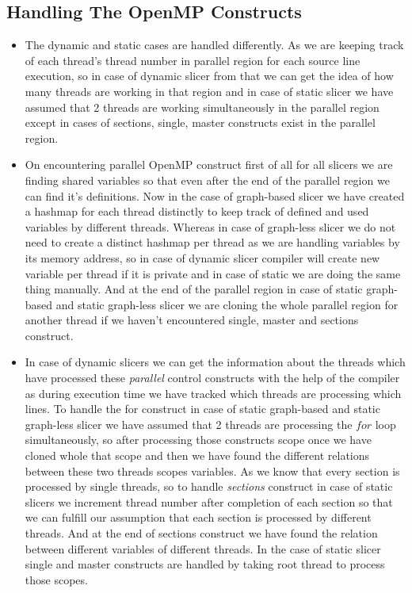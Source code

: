\documentclass[conference]{IEEEtran}
\begin{document}
\subsection{Handling The OpenMP Constructs}
\begin{itemize}
\item The dynamic and static cases are handled  differently. As we are keeping track of each thread’s thread number in parallel region for each source line execution, so in case of dynamic slicer from that we can get the idea of how many threads are working in that region and in case of static slicer we have assumed that 2 threads are working simultaneously in the parallel region except in cases of sections, single, master constructs exist in the parallel region.
\item On encountering parallel OpenMP construct first of all for all slicers we are finding shared variables so that even after the end of the parallel region we can find it’s definitions. Now in the case of graph-based slicer we have created a hashmap for each thread distinctly to keep track of defined and used variables by different threads. Whereas in case of graph-less slicer we do not need to create a distinct hashmap per thread as we are handling variables by its memory address, so in case of dynamic slicer compiler will create new variable per thread if it is private and in case of static we are doing the same thing manually. And at the end of the parallel region in case of static graph-based and static graph-less slicer we are cloning the whole parallel region for another thread if we haven’t encountered single, master and sections construct.
\item In case of dynamic slicers we can get the information about the threads which have processed these \emph{parallel} control constructs with the help of the compiler as during execution time we have tracked which threads are processing which lines. To handle the for construct in case of static graph-based and static graph-less slicer we have assumed that 2 threads are processing the $for$ loop simultaneously, so after processing those constructs scope once we have cloned whole that scope and then we have found the different relations between these two threads scopes variables. As we know that every section is processed by single threads, so to handle \emph{sections} construct in case of static slicers we increment thread number after completion of each section so that we can fulfill our assumption that each section is processed by different threads. And at the end of sections construct we have found the relation between different variables of different threads. In the case of static slicer single and master constructs are handled by taking root thread to process those scopes.

\end{itemize}
\end{document}
